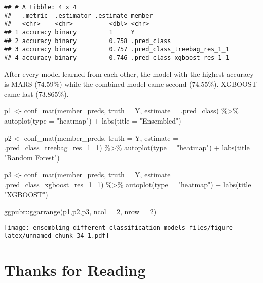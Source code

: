 \documentclass[
]{article}
\newenvironment{Shaded}{\begin{snugshade}}{\end{snugshade}}
\newcommand{\AttributeTok}[1]{\textcolor[rgb]{0.77,0.63,0.00}{#1}}
\newcommand{\DecValTok}[1]{\textcolor[rgb]{0.00,0.00,0.81}{#1}}
\newcommand{\FunctionTok}[1]{\textcolor[rgb]{0.00,0.00,0.00}{#1}}
\newcommand{\NormalTok}[1]{#1}
\newcommand{\OtherTok}[1]{\textcolor[rgb]{0.56,0.35,0.01}{#1}}
\newcommand{\SpecialCharTok}[1]{\textcolor[rgb]{0.00,0.00,0.00}{#1}}
\newcommand{\StringTok}[1]{\textcolor[rgb]{0.31,0.60,0.02}{#1}}
\begin{document}
\begin{verbatim}
## # A tibble: 4 x 4
##   .metric  .estimator .estimate member                     
##   <chr>    <chr>          <dbl> <chr>                      
## 1 accuracy binary         1     Y                          
## 2 accuracy binary         0.758 .pred_class                
## 3 accuracy binary         0.757 .pred_class_treebag_res_1_1
## 4 accuracy binary         0.746 .pred_class_xgboost_res_1_1
\end{verbatim}

After every model learned from each other, the model with the highest
accuracy is MARS (74.59\%) while the combined model came second
(74.55\%). XGBOOST came last (73.865\%).

\begin{Shaded}
\begin{Highlighting}[]
\NormalTok{p1 }\OtherTok{\textless{}{-}} \FunctionTok{conf\_mat}\NormalTok{(member\_preds, }\AttributeTok{truth =}\NormalTok{ Y, }\AttributeTok{estimate =}\NormalTok{ .pred\_class) }\SpecialCharTok{\%\textgreater{}\%} 
  \FunctionTok{autoplot}\NormalTok{(}\AttributeTok{type =} \StringTok{"heatmap"}\NormalTok{) }\SpecialCharTok{+}
  \FunctionTok{labs}\NormalTok{(}\AttributeTok{title =} \StringTok{"Ensembled"}\NormalTok{)}

\NormalTok{p2 }\OtherTok{\textless{}{-}} \FunctionTok{conf\_mat}\NormalTok{(member\_preds, }\AttributeTok{truth =}\NormalTok{ Y, }\AttributeTok{estimate =}\NormalTok{ .pred\_class\_treebag\_res\_1\_1) }\SpecialCharTok{\%\textgreater{}\%} 
  \FunctionTok{autoplot}\NormalTok{(}\AttributeTok{type =} \StringTok{"heatmap"}\NormalTok{) }\SpecialCharTok{+}
  \FunctionTok{labs}\NormalTok{(}\AttributeTok{title =} \StringTok{"Random Forest"}\NormalTok{)}

\NormalTok{p3 }\OtherTok{\textless{}{-}} \FunctionTok{conf\_mat}\NormalTok{(member\_preds, }\AttributeTok{truth =}\NormalTok{ Y, }\AttributeTok{estimate =}\NormalTok{ .pred\_class\_xgboost\_res\_1\_1) }\SpecialCharTok{\%\textgreater{}\%} 
  \FunctionTok{autoplot}\NormalTok{(}\AttributeTok{type =} \StringTok{"heatmap"}\NormalTok{) }\SpecialCharTok{+}
  \FunctionTok{labs}\NormalTok{(}\AttributeTok{title =} \StringTok{"XGBOOST"}\NormalTok{)}

\NormalTok{ggpubr}\SpecialCharTok{::}\FunctionTok{ggarrange}\NormalTok{(p1,p2,p3,}
          \AttributeTok{ncol =} \DecValTok{2}\NormalTok{,}
          \AttributeTok{nrow =} \DecValTok{2}\NormalTok{)}
\end{Highlighting}
\end{Shaded}

\texttt{[image: ensembling-different-classification-models\_files/figure-latex/unnamed-chunk-34-1.pdf]}

\hypertarget{thanks-for-reading}{%
\section{Thanks for Reading}\label{thanks-for-reading}}
\end{document}
